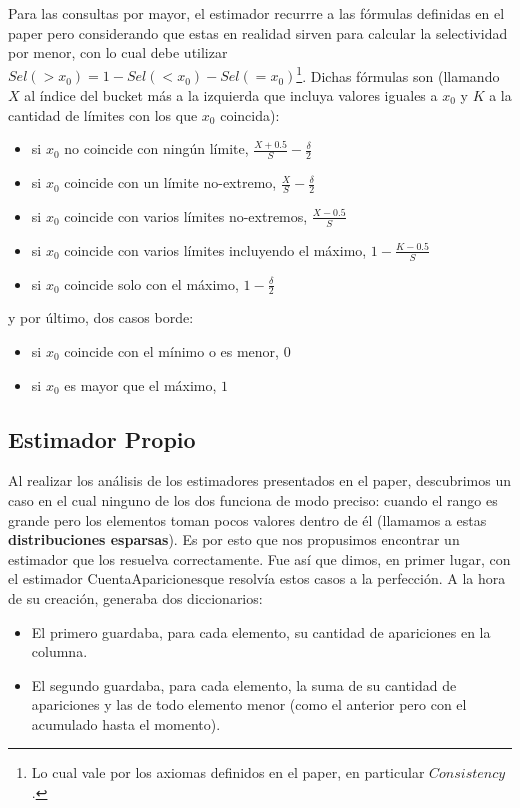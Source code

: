 Para las consultas por mayor, el estimador recurrre a las fórmulas definidas en el paper pero considerando que estas en realidad sirven para calcular la selectividad por menor, con lo cual debe utilizar $Sel(>x_0) = 1 - Sel(<x_0) - Sel(=x_0)$\footnote{Lo cual vale por los axiomas definidos en el paper, en particular $Consistency$.}. Dichas fórmulas son (llamando $X$ al índice del bucket más a la izquierda que incluya valores iguales a $x_0$ y $K$ a la cantidad de límites con los que $x_0$ coincida):
\begin{itemize}
 \item si $x_0$ no coincide con ningún límite, $\frac{X+0.5}{S} - \frac{\delta}{2}$
 \item si $x_0$ coincide con un límite no-extremo, $\frac{X}{S} - \frac{\delta}{2}$
 \item si $x_0$ coincide con varios límites no-extremos, $\frac{X-0.5}{S}$
 \item si $x_0$ coincide con varios límites incluyendo el máximo, $1 - \frac{K-0.5}{S}$
 \item si $x_0$ coincide solo con el máximo, $1 - \frac{\delta}{2}$
\end{itemize}
y por último, dos casos borde:
\begin{itemize}
 \item si $x_0$ coincide con el mínimo o es menor, $0$
 \item si $x_0$ es mayor que el máximo, $1$
\end{itemize}

\subsection{Estimador Propio}
Al realizar los análisis de los estimadores presentados en el paper, descubrimos un caso en el cual ninguno de los dos funciona de modo preciso: cuando el rango es grande pero los elementos toman pocos valores dentro de él (llamamos a estas \textbf{distribuciones esparsas}). Es por esto que nos propusimos encontrar un estimador que los resuelva correctamente. Fue así que dimos, en primer lugar, con el estimador CuentaApariciones\texttrademark que resolvía estos casos a la perfección. A la hora de su creación, generaba dos diccionarios:
\begin{itemize}
 \item El primero guardaba, para cada elemento, su cantidad de apariciones en la columna.
 \item El segundo guardaba, para cada elemento, la suma de su cantidad de apariciones y las de todo elemento menor (como el anterior pero con el acumulado hasta el momento).
\end{itemize}

